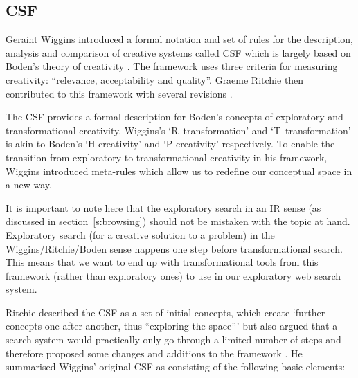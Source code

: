 \subsection{CSF}
\label{s:csf}

Geraint Wiggins introduced a formal notation and set of rules for the description, analysis and comparison of creative systems called \ac{CSF}\autocite*{Wiggins2006} which is largely based on Boden's theory of creativity \autocite*{Boden2003}. The framework uses three criteria for measuring creativity: ``relevance, acceptability and quality''. Graeme Ritchie then contributed to this framework with several revisions \autocite*{Ritchie2012}.

The \ac{CSF} provides a formal description for Boden's concepts of exploratory and transformational creativity. Wiggins's `R–transformation' and `T–transformation' is akin to Boden's `H-creativity' and `P-creativity' respectively. To enable the transition from exploratory to transformational creativity in his framework, Wiggins introduced meta-rules which allow us to redefine our conceptual space in a new way.

It is important to note here that the exploratory search in an \ac{IR} sense (as discussed in section~\ref{s:browsing}) should not be mistaken with the topic at hand. Exploratory search (for a creative solution to a problem) in the Wiggins/Ritchie/Boden sense happens one step before transformational search. This means that we want to end up with transformational tools from this framework (rather than exploratory ones) to use in our exploratory web search system.

Ritchie described the \ac{CSF} as a set of initial concepts, which create `further concepts one after another, thus ``exploring the space''' but also argued that a search system would practically only go through a limited number of steps and therefore proposed some changes and additions to the framework \autocite*{Ritchie2012}. He summarised Wiggins' original \ac{CSF} as consisting of the following basic elements:


